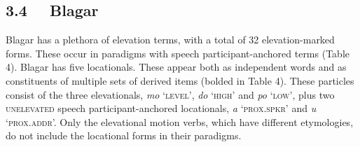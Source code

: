 \subsection[3.4 \ \ Blagar]{3.4 \ \ Blagar}
Blagar has a plethora of elevation terms, with a total of 32 elevation-marked forms. These occur in paradigms with speech participant-anchored terms (Table 4). Blagar has five locationals. These appear both as independent words and as constituents of multiple sets of derived items (bolded in Table 4). These particles consist of the three elevationals, \textit{mo} {\textquoteleft}\textsc{level{\textquoteright},} \textit{do }{\textquoteleft}\textsc{high{\textquoteright}} and \textit{po }{\textquoteleft}\textsc{low{\textquoteright}, }plus two \textsc{unelevated} speech participant-anchored locationals, \textit{{\textglotstop}}\textit{a} {\textquoteleft}\textsc{prox.spkr{\textquoteright}} and \textit{{\textglotstop}}\textit{u} {\textquoteleft}\textsc{prox.addr{\textquoteright}. }Only the elevational motion verbs, which have different etymologies, do not include the locational forms in their paradigms. 

